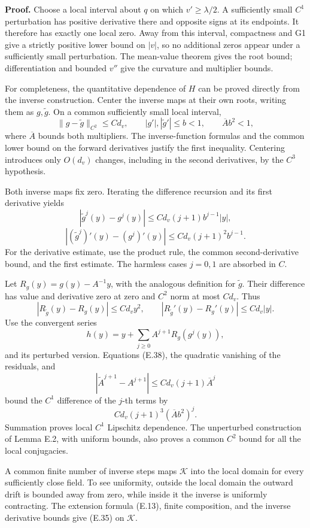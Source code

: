 \textbf{Proof.} Choose a local interval about \(q\) on which
\(v'\ge\lambda/2\). A sufficiently small \(C^1\) perturbation has
positive derivative there and opposite signs at its endpoints. It
therefore has exactly one local zero. Away from this interval,
compactness and G1 give a strictly positive lower bound on \(|v|\), so
no additional zeros appear under a sufficiently small perturbation. The
mean-value theorem gives the root bound; differentiation and bounded
\(v''\) give the curvature and multiplier bounds.

For completeness, the quantitative dependence of \(H\) can be proved
directly from the inverse construction. Center the inverse maps at their
own roots, writing them as \(g,\widetilde g\). On a common sufficiently
small local interval, \[
\|g-\widetilde g\|_{C^2}\le C d_v,\qquad
|g'|,|\widetilde g'|\le b<1,\qquad
\overline A b^2<1,
\tag{E.37}
\] where \(\overline A\) bounds both multipliers. The inverse-function
formulas and the common lower bound on the forward derivatives justify
the first inequality. Centering introduces only \(O(d_v)\) changes,
including in the second derivatives, by the \(C^3\) hypothesis.

Both inverse maps fix zero. Iterating the difference recursion and its
first derivative yields \[
|\widetilde g^j(y)-g^j(y)|
\le C d_v(j+1)b^{j-1}|y|,
\] \[
|(\widetilde g^j)'(y)-(g^j)'(y)|
\le C d_v(j+1)^2b^{j-1}.
\tag{E.38}
\] For the derivative estimate, use the product rule, the common
second-derivative bound, and the first estimate. The harmless cases
\(j=0,1\) are absorbed in \(C\).

Let \(R_g(y)=g(y)-A^{-1}y\), with the analogous definition for
\(\widetilde g\). Their difference has value and derivative zero at zero
and \(C^2\) norm at most \(C d_v\). Thus \[
|R_{\widetilde g}(y)-R_g(y)|\le C d_v y^2,\qquad
|R_{\widetilde g}'(y)-R_g'(y)|\le C d_v|y|.
\] Use the convergent series \[
h(y)=y+\sum_{j\ge0}A^{j+1}R_g(g^j(y)),
\tag{E.39}
\] and its perturbed version. Equations (E.38), the quadratic vanishing
of the residuals, and \[
|\widetilde A^{j+1}-A^{j+1}|
\le C d_v(j+1)\overline A^j
\] bound the \(C^1\) difference of the \(j\)-th terms by \[
C d_v(j+1)^3(\overline A b^2)^j.
\] Summation proves local \(C^1\) Lipschitz dependence. The unperturbed
construction of Lemma E.2, with uniform bounds, also proves a common
\(C^2\) bound for all the local conjugacies.

A common finite number of inverse steps maps \(\mathcal K\) into the
local domain for every sufficiently close field. To see uniformity,
outside the local domain the outward drift is bounded away from zero,
while inside it the inverse is uniformly contracting. The extension
formula (E.13), finite composition, and the inverse derivative bounds
give (E.35) on \(\mathcal K\).

